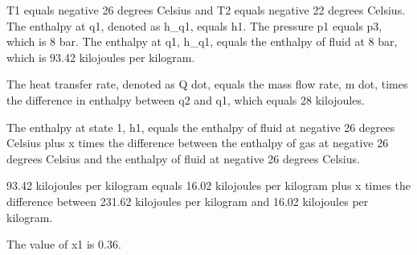 T1 equals negative 26 degrees Celsius and T2 equals negative 22 degrees Celsius. The enthalpy at q1, denoted as h_q1, equals h1. The pressure p1 equals p3, which is 8 bar. The enthalpy at q1, h_q1, equals the enthalpy of fluid at 8 bar, which is 93.42 kilojoules per kilogram.

The heat transfer rate, denoted as Q dot, equals the mass flow rate, m dot, times the difference in enthalpy between q2 and q1, which equals 28 kilojoules.

The enthalpy at state 1, h1, equals the enthalpy of fluid at negative 26 degrees Celsius plus x times the difference between the enthalpy of gas at negative 26 degrees Celsius and the enthalpy of fluid at negative 26 degrees Celsius.

93.42 kilojoules per kilogram equals 16.02 kilojoules per kilogram plus x times the difference between 231.62 kilojoules per kilogram and 16.02 kilojoules per kilogram.

The value of x1 is 0.36.